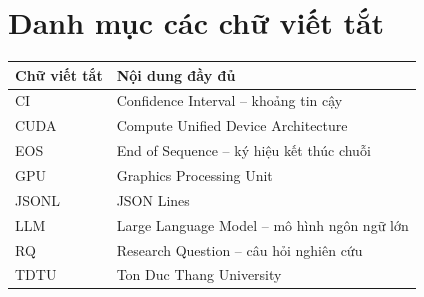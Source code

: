 \chapter*{Danh mục các chữ viết tắt}

\begin{center}
\begin{tabular}{@{}p{}p{}@{}}
\toprule
\textbf{Chữ viết tắt} & \textbf{Nội dung đầy đủ} \\
\midrule
CI & Confidence Interval -- khoảng tin cậy \\
CUDA & Compute Unified Device Architecture \\
EOS & End of Sequence -- ký hiệu kết thúc chuỗi \\
GPU & Graphics Processing Unit \\
JSONL & JSON Lines \\
LLM & Large Language Model -- mô hình ngôn ngữ lớn \\
RQ & Research Question -- câu hỏi nghiên cứu \\
TDTU & Ton Duc Thang University \\
\bottomrule
\end{tabular}
\end{center}
\clearpage
